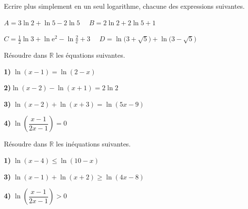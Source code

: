 



 
	\begin{exercice}
Ecrire plus simplement en un seul logarithme, chacune des expressions suivantes.

\medskip

 $ A=3\ln 2+\ln 5-2\ln 5\quad  $  $ B=2\ln 2+2\ln 5+1 $ 
 \bigskip
 
  $ C=\frac{1}{2}\ln3+ \ln \text{e}^2-\ln \frac{2}{\text{e}}+3\quad  $  $ D=\ln \bigl(3+\sqrt{5}\bigr)+\ln \bigl(3-\sqrt{5}\bigr) $
\end{exercice}

\begin{exercice}
Résoudre dans $ \mathbb{R} $ les équations suivantes.\medskip

\textbf{1)}\;  $ \ln(x-1)=\ln(2-x)  $  \medskip

\textbf{2)}\;$ \ln (x -2)-\ln (x+1)=2\ln 2 $ \medskip

 \textbf{3)}\; $ \ln ( x-2 )+\ln (x+3)=\ln(5x-9)$ \medskip
 
  \textbf{4)}\; $ \ln \left(\dfrac{x-1}{2x-1}\right) =0$ 
\end{exercice}

\begin{exercice}
Résoudre dans $ \mathbb{R} $ les inéquations suivantes.\medskip

\textbf{1)}\;  $ \ln(x-4)\leq \ln(10-x)  $  \medskip

 \textbf{3)}\; $ \ln ( x-1 )+\ln (x+2)\geq \ln (4x-8)$ \medskip
 
  \textbf{4)}\; $ \ln \left(\dfrac{x-1}{2x-1}\right) >0$ 
\end{exercice}

